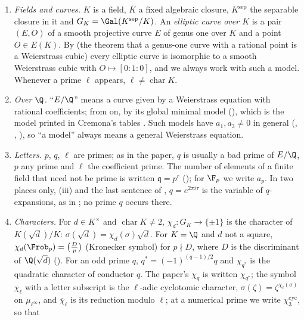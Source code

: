 \begin{convention}\label{conv:ellcurves:conventions}
\leavevmode
\begin{enumerate}[label=(\alph*)]
\item \emph{Fields and curves.} $K$ is a field, $\bar K$ a fixed algebraic closure, $K^{\mathrm{sep}}$ the separable closure in it and
$G_K=\Gal(K^{\mathrm{sep}}/K)$. An \emph{elliptic curve over $K$} is a pair $(E,O)$ of a smooth projective curve $E$ of genus one over $K$
and a point $O\in E(K)$. By  (the theorem that a genus-one curve with a rational point is a Weierstrass
cubic) every elliptic curve is isomorphic to a smooth Weierstrass cubic with $O\mapsto[0:1:0]$, and we always work with such a model.
Whenever a prime $\ell$ appears, $\ell\ne\operatorname{char}K$.
\item \emph{Over $\Q$.} ``$E/\Q$'' means a curve given by a Weierstrass equation with rational coefficients; from
 on, by its global minimal model (), which is the model printed in Cremona's tables
\cite{Cremona97,ecdata}. Such models have $a_1,a_3\ne0$ in general (, , ), so ``a model'' always
means a general Weierstrass equation.
\item \emph{Letters.} $p$, $q$, $\ell$ are primes; as in the paper, $q$ is usually a bad prime of $E/\Q$, $p$ any prime and $\ell$ the
coefficient prime. The number of elements of a finite field that need not be prime is written $\mathfrak q=p^r$
(); for $\F_p$ we write $a_p$. In two places only, (iii) and the last sentence of
, $q=e^{2\pi i\tau}$ is the variable of $q$-expansions, as in ; no prime $q$ occurs there.
\item \emph{Characters.} For $d\in K^\times$ and $\operatorname{char}K\ne2$, $\chi_d\colon G_K\to\{\pm1\}$ is the character of $K(\sqrt d)/K$:
$\sigma(\sqrt d)=\chi_d(\sigma)\sqrt d$. For $K=\Q$ and $d$ not a square, $\chi_d(\Frob_p)=\bigl(\frac Dp\bigr)$ (Kronecker symbol) for
$p\nmid D$, where $D$ is the discriminant of $\Q(\sqrt d)$ (). For an odd prime $q$,
$q^*=(-1)^{(q-1)/2}q$ and $\chi_{q^*}$ is the quadratic character of conductor $q$. The paper's $\chi_q$ is written $\chi_{q^*}$; the
symbol $\chi_\ell$ with a letter subscript is the $\ell$-adic cyclotomic character, $\sigma(\zeta)=\zeta^{\chi_\ell(\sigma)}$ on
$\mu_{\ell^\infty}$, and $\bar\chi_\ell$ is its reduction modulo $\ell$; at a numerical prime we write $\chi_3^{\mathrm{cyc}}$, so that

\end{enumerate}
\end{convention}
